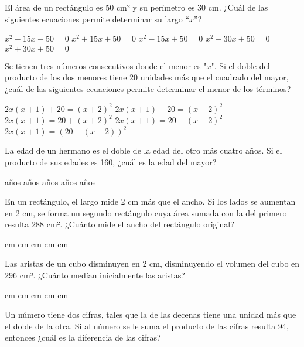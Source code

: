 \documentclass[sin nombre]{srs}
\begin{document}
\begin{preguntas}[after-item-skip=2cm]
\pregunta El área de un rectángulo es 50 cm² y su perímetro es 30 cm. ¿Cuál de las siguientes ecuaciones permite determinar su largo “$x$”?
\begin{vertical}
\alternativa $x^{2} - 15x - 50 = 0$
\alternativa $x^{2} + 15x + 50 = 0$
\alternativa $x^{2} - 15x + 50 = 0$
\alternativa $x^{2} - 30x + 50 = 0$
\alternativa $x^{2} + 30x + 50 = 0$
\end{vertical}

\pregunta Se tienen tres números consecutivos donde el menor es "$x$". Si el doble del producto de los dos menores tiene 20 unidades más que el cuadrado del mayor, ¿cuál de las siguientes ecuaciones permite determinar el menor de los términos?
\begin{vertical}
\alternativa $2x\left(x + 1\right) + 20 = \left(x + 2\right)^{2}$
\alternativa $2x\left(x + 1\right) - 20 = \left(x + 2\right)^{2}$
\alternativa $2x\left(x + 1\right) = 20 + \left(x + 2\right)^{2}$
\alternativa $2x\left(x + 1\right) = 20 - \left(x + 2\right)^{2}$
\alternativa $2x\left(x + 1\right) = \left(20 - \left(x + 2\right)\right)^{2}$
\end{vertical}

\pregunta La edad de un hermano es el doble de la edad del otro más cuatro años. Si el producto de sus edades es 160, ¿cuál es la edad del mayor?
\begin{vertical}
 años
 años
 años
 años
 años
\end{vertical}

\pregunta En un rectángulo, el largo mide 2 cm más que el ancho. Si los lados se aumentan en 2 cm, se forma un segundo rectángulo cuya área sumada con la del primero resulta 288 cm². ¿Cuánto mide el ancho del rectángulo original?
\begin{vertical}
 cm
 cm
 cm
 cm
 cm
\end{vertical}

\pregunta Las aristas de un cubo disminuyen en 2 cm, disminuyendo el volumen del cubo en 296 cm³. ¿Cuánto medían inicialmente las aristas?
\begin{vertical}
 cm
 cm
 cm
 cm
 cm
\end{vertical}

\pregunta Un número tiene dos cifras, tales que la de las decenas tiene una unidad más que el doble de la otra. Si al número se le suma el producto de las cifras resulta 94, entonces ¿cuál es la diferencia de las cifras?
\begin{vertical}
\end{vertical}


\end{preguntas}
\end{document}

